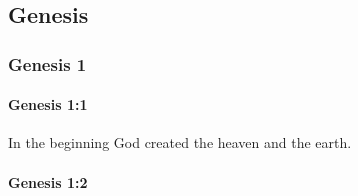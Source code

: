 \subsection{Genesis}
	\label{GENESIS}

	\subsubsection{Genesis 1} %
		\label{GENESIS-1}

		\paragraph{Genesis 1:1} %
			\label{GENESIS-1-1}

			In the beginning God created the heaven and the earth.

			\begin{framed}
			\scriptsize
				\begin{compactdesc}
					\item[LXX] 
				\end{compactdesc}
			\end{framed}

		\paragraph{Genesis 1:2} %
			\label{GENESIS-1-2}

